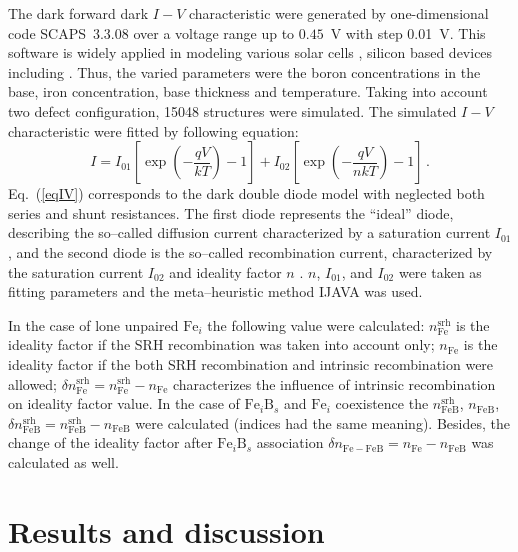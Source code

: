 The dark forward dark $I-V$ characteristic were generated by
one-dimensional code SCAPS~3.3.08 \cite{SCAPS1,SCAPS2}
over a voltage range up to $0.45$~V with step 0.01~V.
This software is widely applied in modeling various solar cells \cite{SCAPSuse1,SCAPSuse2,SCAPSuse3,SCAPSuse5,SCAPSuseSi1,SCAPSuseSi4,SCAPSuseSi3},
silicon based devices including \cite{SCAPSuseSi1,SCAPSuseSi3,SCAPSuseSi4}.
Thus, the varied parameters were the boron concentrations in the base, iron concentration, base thickness and temperature.
Taking into account two defect configuration, 15048 structures were simulated.
The simulated $I-V$ characteristic were fitted by following equation:
\begin{equation}
\label{eqIV}
    I=I_{01}\left[\exp\left(-\frac{qV}{kT}\right)-1\right]+ I_{02}\left[\exp\left(-\frac{qV}{nkT}\right)-1\right]\,.
\end{equation}
Eq.~(\ref{eqIV}) corresponds to the dark double diode model with neglected both series and shunt resistances.
The first diode represents the ``ideal'' diode, describing the so--called diffusion current characterized by a saturation current $I_{01}$,
and the second diode is the so--called recombination current, characterized by the saturation current $I_{02}$ and ideality factor $n$ \cite{Breitenstein2013}.
$n$, $I_{01}$, and $I_{02}$ were taken as fitting parameters and the meta--heuristic method IJAVA \cite{IJAVA} was used.



In the case of lone unpaired $\mathrm{Fe}_i$ the following value were calculated:
$n_\mathrm{Fe}^\mathrm{srh}$ is the ideality factor if the SRH recombination was taken into account only;
$n_\mathrm{Fe}$ is the ideality factor if the both SRH recombination and intrinsic recombination were allowed;
$\delta n_\mathrm{Fe}^\mathrm{srh}=n_\mathrm{Fe}^\mathrm{srh}-n_\mathrm{Fe}$ characterizes the influence of intrinsic recombination on ideality factor value.
In the case of $\mathrm{Fe}_i\mathrm{B}_s$ and $\mathrm{Fe}_i$ coexistence the
$n_\mathrm{FeB}^\mathrm{srh}$, $n_\mathrm{FeB}$, $\delta n_\mathrm{FeB}^\mathrm{srh}=n_\mathrm{FeB}^\mathrm{srh}-n_\mathrm{FeB}$ were calculated (indices had the same meaning).
Besides, the change of the ideality factor after $\mathrm{Fe}_i\mathrm{B}_s$ association $\delta n_\mathrm{Fe-FeB}=n_\mathrm{Fe}-n_\mathrm{FeB}$ was calculated as well.


\section{Results and discussion}



